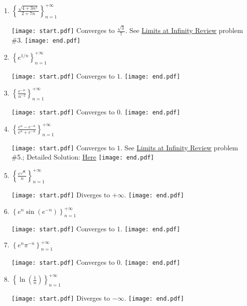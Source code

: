 \documentclass[12pt]{article}
\begin{document}
\begin{enumerate}
\item $\left\{ \frac{\sqrt{4+3n^2}}{2+7n} \right\}_{n = 1}^{+\infty}$

\texttt{[image: start.pdf]}
{{Converges to $\frac{\sqrt{3}}{7}$.  See \underline{Limits at Infinity Review} problem \#3.}}
\texttt{[image: end.pdf]}


\item $\left\{ e^{1/n} \right\}_{n = 1}^{+\infty}$

\texttt{[image: start.pdf]}
{{Converges to $1$.}}
\texttt{[image: end.pdf]}


\item $\left\{ \frac{e^{-n}}{n^{-2}} \right\}_{n = 1}^{+\infty}$

\texttt{[image: start.pdf]}
{{Converges to $0$.}}
\texttt{[image: end.pdf]}


\item $\left\{ \frac{e^n-e^{-n}}{e^n+e^{-n}} \right\}_{n = 1}^{+\infty}$

\texttt{[image: start.pdf]}
{{Converges to $1$.  See \underline{Limits at Infinity Review} problem \#5.; Detailed Solution: \textcolor{blue}{\href{http://www.math.drexel.edu/classes/Calculus/resources/Math123HW/Solutions/123_05_Sequences_21.pdf}{Here}}}}
\texttt{[image: end.pdf]}



\item $\left\{ \frac{e^{\sqrt{n}}}{n} \right\}_{n = 1}^{+\infty}$

\texttt{[image: start.pdf]}
{{Diverges to $+\infty$.}}
\texttt{[image: end.pdf]}


\item $\left\{e^n \sin(e^{-n}) \right\}_{n = 1}^{+\infty}$ 

\texttt{[image: start.pdf]}
{{Converges to $1$.}}
\texttt{[image: end.pdf]}


\item $\left\{ e^n \pi^{-n} \right\}_{n = 1}^{+\infty}$

\texttt{[image: start.pdf]}
{{Converges to $0$.}}
\texttt{[image: end.pdf]}


\item $\left\{ \ln{\left(\frac{1}{n}\right)} \right\}_{n = 1}^{+\infty}$

\texttt{[image: start.pdf]}
{{Diverges to $-\infty$.}}
\texttt{[image: end.pdf]}



\end{enumerate}
\end{document}
